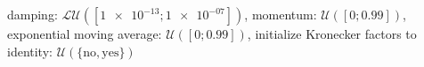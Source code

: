 damping: $\mathcal{LU}([\num[scientific-notation=true]{1e-13}; \num[scientific-notation=true]{1e-07}])$, momentum: $\mathcal{U}([\num[scientific-notation=false]{0}; \num[scientific-notation=true]{0.99}])$, exponential moving average: $\mathcal{U}([\num[scientific-notation=false]{0}; \num[scientific-notation=true]{0.99}])$, initialize Kronecker factors to identity: $\mathcal{U}(\{\text{no},\text{yes}\})$